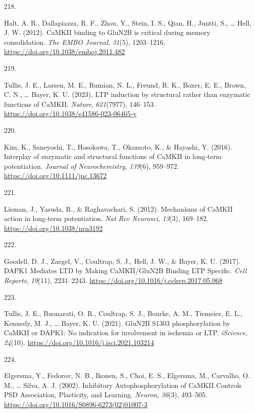 \documentclass[
  11pt,
  letterpaper,
]{scrreprt}
\newlength{\cslhangindent}
\newlength{\csllabelwidth}
\newenvironment{CSLReferences}[2] %
 {\begin{list}{}{%
  \setlength{\itemindent}{0pt}
  \setlength{\leftmargin}{0pt}
  \setlength{\parsep}{0pt}
  \ifodd #1
   \setlength{\leftmargin}{\cslhangindent}
   \setlength{\itemindent}{-1\cslhangindent}
  \fi
  \setlength{\itemsep}{#2\baselineskip}}}
 {\end{list}}
\newcommand{\CSLLeftMargin}[1]{\parbox[t]{\csllabelwidth}{\strut#1\strut}}
\newcommand{\CSLRightInline}[1]{\parbox[t]{\linewidth - \csllabelwidth}{\strut#1\strut}}
\begin{document}
\begin{CSLReferences}{0}{0}
\CSLLeftMargin{218. }%
\CSLRightInline{Halt, A. R., Dallapiazza, R. F., Zhou, Y., Stein, I. S.,
Qian, H., Juntti, S., \ldots{} Hell, J. W. (2012). {CaMKII} binding to
{GluN2B} is critical during memory consolidation. \emph{The EMBO
Journal}, \emph{31}(5), 1203--1216.
\url{https://doi.org/10.1038/emboj.2011.482}}

\CSLLeftMargin{219. }%
\CSLRightInline{Tullis, J. E., Larsen, M. E., Rumian, N. L., Freund, R.
K., Boxer, E. E., Brown, C. N., \ldots{} Bayer, K. U. (2023). {LTP}
induction by structural rather than enzymatic functions of {CaMKII}.
\emph{Nature}, \emph{621}(7977), 146--153.
\url{https://doi.org/10.1038/s41586-023-06465-y}}

\CSLLeftMargin{220. }%
\CSLRightInline{Kim, K., Saneyoshi, T., Hosokawa, T., Okamoto, K., \&
Hayashi, Y. (2016). Interplay of enzymatic and structural functions of
{CaMKII} in long-term potentiation. \emph{Journal of Neurochemistry},
\emph{139}(6), 959--972. \url{https://doi.org/10.1111/jnc.13672}}

\CSLLeftMargin{221. }%
\CSLRightInline{Lisman, J., Yasuda, R., \& Raghavachari, S. (2012).
Mechanisms of {CaMKII} action in long-term potentiation. \emph{Nat Rev
Neurosci}, \emph{13}(3), 169--182.
\url{https://doi.org/10.1038/nrn3192}}

\CSLLeftMargin{222. }%
\CSLRightInline{Goodell, D. J., Zaegel, V., Coultrap, S. J., Hell, J.
W., \& Bayer, K. U. (2017). {DAPK1 Mediates LTD} by {Making
CaMKII}/{GluN2B Binding LTP Specific}. \emph{Cell Reports},
\emph{19}(11), 2231--2243.
\url{https://doi.org/10.1016/j.celrep.2017.05.068}}

\CSLLeftMargin{223. }%
\CSLRightInline{Tullis, J. E., Buonarati, O. R., Coultrap, S. J.,
Bourke, A. M., Tiemeier, E. L., Kennedy, M. J., \ldots{} Bayer, K. U.
(2021). {GluN2B S1303} phosphorylation by {CaMKII} or {DAPK1}: {No}
indication for involvement in ischemia or {LTP}. \emph{iScience},
\emph{24}(10). \url{https://doi.org/10.1016/j.isci.2021.103214}}

\CSLLeftMargin{224. }%
\CSLRightInline{Elgersma, Y., Fedorov, N. B., Ikonen, S., Choi, E. S.,
Elgersma, M., Carvalho, O. M., \ldots{} Silva, A. J. (2002). Inhibitory
{Autophosphorylation} of {CaMKII Controls PSD Association},
{Plasticity}, and {Learning}. \emph{Neuron}, \emph{36}(3), 493--505.
\url{https://doi.org/10.1016/S0896-6273(02)01007-3}}


\end{CSLReferences}
\end{document}
